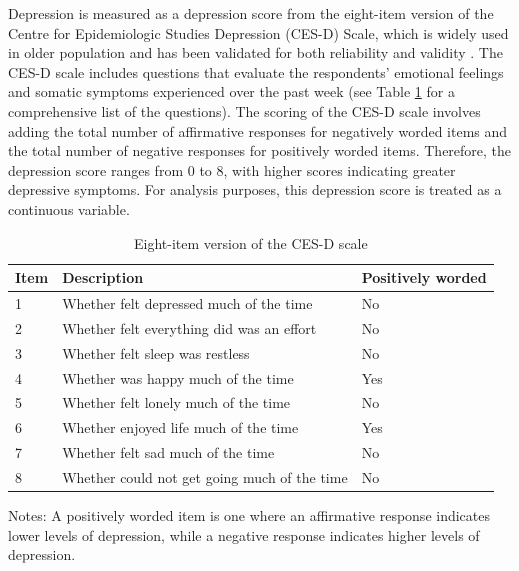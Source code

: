 Depression is measured as a depression score from the eight-item version of the Centre for Epidemiologic Studies Depression (CES-D) Scale, which is widely used in older population and has been validated for both reliability and validity \parencite{white_duration_2016}. The CES-D scale includes questions that evaluate the respondents' emotional feelings and somatic symptoms experienced over the past week (see Table \ref{tab:cesd} for a comprehensive list of the questions). The scoring of the CES-D scale involves adding the total number of affirmative responses for negatively worded items and the total number of negative responses for positively worded items. Therefore, the depression score ranges from 0 to 8, with higher scores indicating greater depressive symptoms. For analysis purposes, this depression score is treated as a continuous variable.

\begin{table}[h!]
    \centering
    \caption{Eight-item version of the CES-D scale}
    \label{tab:cesd}
    \begin{threeparttable}
        \begin{tabular}{lll}
            \toprule
            Item & Description & Positively worded \\
            \midrule
            1 & Whether felt depressed much of the time & No \\
            2 & Whether felt everything did was an effort & No \\
            3 & Whether felt sleep was restless & No \\
            4 & Whether was happy much of the time & Yes \\
            5 & Whether felt lonely much of the time & No \\
            6 & Whether enjoyed life much of the time & Yes \\
            7 & Whether felt sad much of the time & No \\
            8 & Whether could not get going much of the time & No \\
            \bottomrule
        \end{tabular}
        \begin{tablenotes}
            \footnotesize
            \item Notes: A positively worded item is one where an affirmative response indicates lower levels of depression, while a negative response indicates higher levels of depression.
        \end{tablenotes}
    \end{threeparttable}
\end{table}

